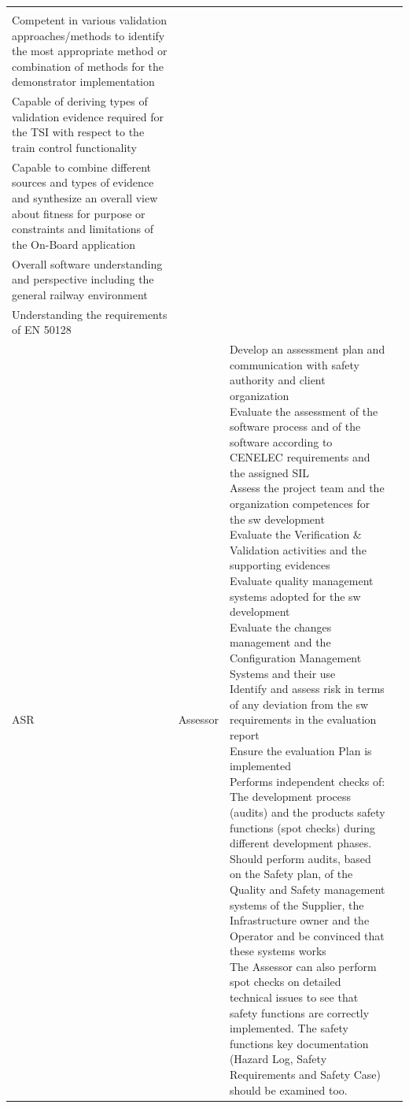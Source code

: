 \documentclass{template/openetcs_article}
\begin{document}
\begin{landscape}
\begin{appendices}
\begin{center}
\begin{longtable}{|m{1cm}|m{}|m{11cm}|m{10cm}|}
{Experience in safety attributes for train control systems\\
Competent in various validation approaches/methods to identify the most appropriate method or combination of methods for the demonstrator implementation\\
Capable of deriving types of validation evidence required for the \gls{TSI} with respect to the train control functionality\\
Capable to combine different sources and types of evidence and synthesize an overall view about fitness for purpose or constraints and limitations of the On-Board application\\
Overall software understanding and perspective including the general railway environment\\
Understanding the requirements of EN 50128}
\\\hline
\gls{ASR} &
Assessor &
\parbox{11cm}{\raggedright
Develop an assessment plan and communication with safety authority and client organization\\
Evaluate the assessment of the software process and of the software according to CENELEC requirements and the assigned \gls{SIL}\\
Assess the project team and the organization competences for the sw development\\
Evaluate the Verification \& Validation activities and the supporting evidences\\
Evaluate quality management systems adopted for  the sw development\\
Evaluate the changes management and the Configuration Management Systems and their use\\
Identify and assess risk in terms of any deviation from the sw requirements in the evaluation report\\
Ensure the evaluation Plan is implemented\\
Performs independent checks of: The development process (audits) and the products safety functions (spot checks) during different development phases.\\
Should perform audits, based on the Safety plan, of the Quality and Safety management systems of the Supplier, the Infrastructure owner and the Operator and be convinced that these systems works\\
The Assessor can also perform spot checks on detailed technical issues to see that safety functions are correctly implemented. The safety functions key documentation (Hazard Log, Safety Requirements and Safety Case) should be examined too.\\
}
\end{longtable}
\end{center}
\end{appendices}
\end{landscape}
\end{document}
